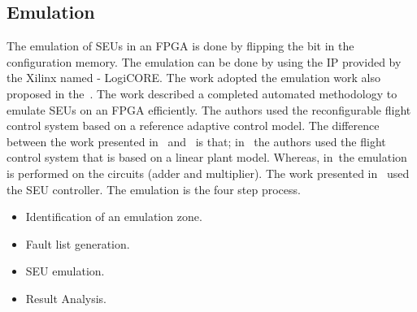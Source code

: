 \subsection{Emulation}
The emulation of SEUs in an FPGA is done by flipping the bit in the configuration memory. The emulation can be done by using the IP provided by the Xilinx named - LogiCORE. The work adopted the emulation work also proposed in the~\cite{hobeika2013flight}.  The work described a completed automated methodology to emulate SEUs on an FPGA efficiently. The authors used the reconfigurable flight control system based on a reference adaptive control model. The difference between the work presented in~\cite{hobeika2014multi} and~\cite{hobeika2013flight} is that; in~\cite{hobeika2013flight} the authors used the flight control system that is based on a linear plant model. Whereas, in~\cite{hobeika2014multi}the emulation is performed on the circuits (adder and multiplier). The work presented in~\cite{hobeika2014multi} used the SEU controller. The emulation is the four step process.

\begin{itemize}

\item Identification of an emulation zone.
\item Fault list generation.
\item SEU emulation.
\item Result Analysis.

\end{itemize}



